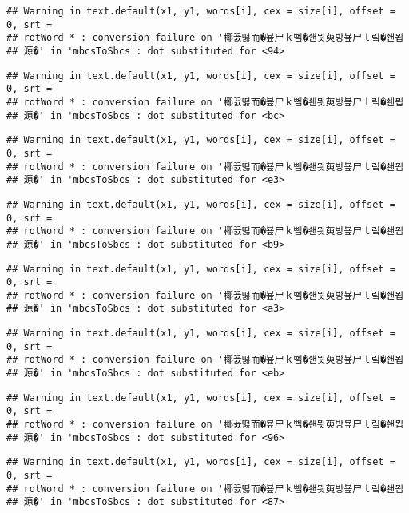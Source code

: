 \documentclass[]{article}
\begin{document}
\begin{verbatim}
## Warning in text.default(x1, y1, words[i], cex = size[i], offset = 0, srt =
## rotWord * : conversion failure on '椰꾨떯而�뵾尸ｋ뻼�쇈묏萸방뵾尸ｌ맄�쇈묍
## 源�' in 'mbcsToSbcs': dot substituted for <94>
\end{verbatim}

\begin{verbatim}
## Warning in text.default(x1, y1, words[i], cex = size[i], offset = 0, srt =
## rotWord * : conversion failure on '椰꾨떯而�뵾尸ｋ뻼�쇈묏萸방뵾尸ｌ맄�쇈묍
## 源�' in 'mbcsToSbcs': dot substituted for <bc>
\end{verbatim}

\begin{verbatim}
## Warning in text.default(x1, y1, words[i], cex = size[i], offset = 0, srt =
## rotWord * : conversion failure on '椰꾨떯而�뵾尸ｋ뻼�쇈묏萸방뵾尸ｌ맄�쇈묍
## 源�' in 'mbcsToSbcs': dot substituted for <e3>
\end{verbatim}

\begin{verbatim}
## Warning in text.default(x1, y1, words[i], cex = size[i], offset = 0, srt =
## rotWord * : conversion failure on '椰꾨떯而�뵾尸ｋ뻼�쇈묏萸방뵾尸ｌ맄�쇈묍
## 源�' in 'mbcsToSbcs': dot substituted for <b9>
\end{verbatim}

\begin{verbatim}
## Warning in text.default(x1, y1, words[i], cex = size[i], offset = 0, srt =
## rotWord * : conversion failure on '椰꾨떯而�뵾尸ｋ뻼�쇈묏萸방뵾尸ｌ맄�쇈묍
## 源�' in 'mbcsToSbcs': dot substituted for <a3>
\end{verbatim}

\begin{verbatim}
## Warning in text.default(x1, y1, words[i], cex = size[i], offset = 0, srt =
## rotWord * : conversion failure on '椰꾨떯而�뵾尸ｋ뻼�쇈묏萸방뵾尸ｌ맄�쇈묍
## 源�' in 'mbcsToSbcs': dot substituted for <eb>
\end{verbatim}

\begin{verbatim}
## Warning in text.default(x1, y1, words[i], cex = size[i], offset = 0, srt =
## rotWord * : conversion failure on '椰꾨떯而�뵾尸ｋ뻼�쇈묏萸방뵾尸ｌ맄�쇈묍
## 源�' in 'mbcsToSbcs': dot substituted for <96>
\end{verbatim}

\begin{verbatim}
## Warning in text.default(x1, y1, words[i], cex = size[i], offset = 0, srt =
## rotWord * : conversion failure on '椰꾨떯而�뵾尸ｋ뻼�쇈묏萸방뵾尸ｌ맄�쇈묍
## 源�' in 'mbcsToSbcs': dot substituted for <87>
\end{verbatim}
\end{document}
